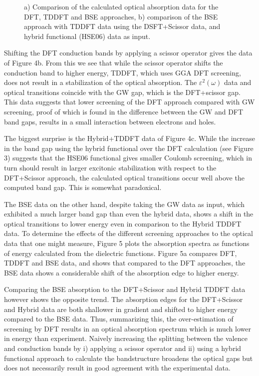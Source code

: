 \documentclass[prb,showpacs,superscriptaddress,titlepage,amsmath,amssymb,twocolumn]{revtex4-1}
\begin{document}
\begin{figure}[!t]
    \centering
    \caption{a) Comparison of the calculated optical absorption data for the DFT, TDDFT and BSE approaches, b) comparison of the BSE approach with TDDFT data using the DSFT+Scissor data, and hybrid functional (HSE06) data as input. }
    \label{fig:bs}
\end{figure}

Shifting the DFT conduction bands by applying a scissor operator gives the data of Figure 4b. From this we see that while the scissor operator shifts the conduction band to higher energy, TDDFT, which uses GGA DFT screening, does not result in a stabilization of the optical absorption. The $\varepsilon^2(\omega)$ data and optical transitions coincide with the GW gap, which is the DFT+scissor gap. This data suggests that lower screening of the DFT approach compared with GW screening, proof of which is found in the difference between the GW and DFT band gaps, results in a small interaction between electrons and holes.

The biggest surprise is the Hybrid+TDDFT data of Figure 4c. While the increase in the band gap using the hybrid functional over the DFT calculation (see Figure 3) suggests that the HSE06 functional gives smaller Coulomb screening, which in turn should result in larger excitonic stabilization with respect to the DFT+Scissor approach, the calculated optical transitions occur well above the computed band gap. This is somewhat paradoxical.

The BSE data on the other hand, despite taking the GW data as input, which exhibited a much larger band gap than even the hybrid data, shows a shift in the optical transitions to lower energy even in comparison to the Hybrid TDDFT data. To determine the effects of the different screening approaches to the optical data that one might measure, Figure 5 plots the absorption spectra as functions of energy calculated from the dielectric functions. Figure 5a compares DFT, TDDFT and BSE data, and shows that compared to the DFT approaches, the BSE data shows a considerable shift of the absorption edge to higher energy.

Comparing the BSE absorption to the DFT+Scissor and Hybrid TDDFT data however shows the opposite trend. The absorption edges for the DFT+Scissor and Hybrid data are both shallower in gradient and shifted to higher energy compared to the BSE data. Thus, summarizing this, the over-estimation of screening by DFT results in an optical absorption spectrum which is much lower in energy than experiment. Naively increasing the splitting between the valence and conduction bands by i) applying a scissor operator and ii) using a hybrid functional approach to calculate the bandstructure broadens the optical gaps but does not necessarily result in good agreement with the experimental data.
\end{document}

